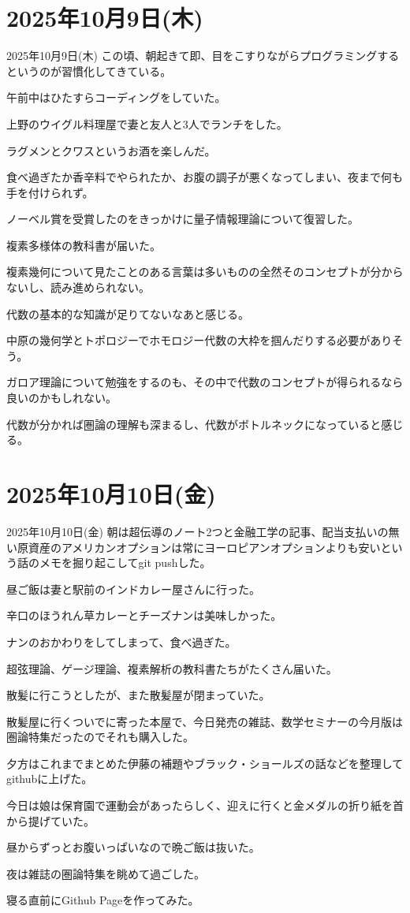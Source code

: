 \documentclass[dvipdfmx, autodetect-engine, aspectratio=169, 10.5pt]{beamer}
\begin{document}
\section{2025年10月9日(木)}

\begin{frame}{2025年10月9日(木)}
\scriptsize
この頃、朝起きて即、目をこすりながらプログラミングするというのが習慣化してきている。

午前中はひたすらコーディングをしていた。

上野のウイグル料理屋で妻と友人と3人でランチをした。

ラグメンとクワスというお酒を楽しんだ。

食べ過ぎたか香辛料でやられたか、お腹の調子が悪くなってしまい、夜まで何も手を付けられず。

ノーベル賞を受賞したのをきっかけに量子情報理論について復習した。

複素多様体の教科書が届いた。

複素幾何について見たことのある言葉は多いものの全然そのコンセプトが分からないし、読み進められない。

代数の基本的な知識が足りてないなあと感じる。

中原の幾何学とトポロジーでホモロジー代数の大枠を掴んだりする必要がありそう。

ガロア理論について勉強をするのも、その中で代数のコンセプトが得られるなら良いのかもしれない。

代数が分かれば圏論の理解も深まるし、代数がボトルネックになっていると感じる。
\end{frame}

\section{2025年10月10日(金)}

\begin{frame}{2025年10月10日(金)}
\scriptsize
朝は超伝導のノート2つと金融工学の記事、配当支払いの無い原資産のアメリカンオプションは常にヨーロピアンオプションよりも安いという話のメモを掘り起こしてgit pushした。

昼ご飯は妻と駅前のインドカレー屋さんに行った。

辛口のほうれん草カレーとチーズナンは美味しかった。

ナンのおかわりをしてしまって、食べ過ぎた。

超弦理論、ゲージ理論、複素解析の教科書たちがたくさん届いた。

散髪に行こうとしたが、また散髪屋が閉まっていた。

散髪屋に行くついでに寄った本屋で、今日発売の雑誌、数学セミナーの今月版は圏論特集だったのでそれも購入した。

夕方はこれまでまとめた伊藤の補題やブラック・ショールズの話などを整理してgithubに上げた。

今日は娘は保育園で運動会があったらしく、迎えに行くと金メダルの折り紙を首から提げていた。

昼からずっとお腹いっぱいなので晩ご飯は抜いた。

夜は雑誌の圏論特集を眺めて過ごした。

寝る直前にGithub Pageを作ってみた。
\end{frame}
\end{document}
